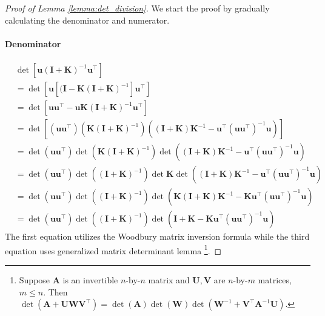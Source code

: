 \begin{proof}[Proof of Lemma \ref{lemma:det_division}]
We start the proof by gradually calculating the denominator and numerator.
\paragraph{Denominator}

\begin{align*}
&\det[\mathbf{u} (\mathbf{I} + \mathbf{K})^{-1} \mathbf{u}^\top] \\ &= \det [\mathbf{u} \left[ (\mathbf{I} - \mathbf{K}(\mathbf{I}+\mathbf{K})^{-1}\right]\mathbf{u}^\top]\\
&=\det [\mathbf{u} \mathbf{u}^\top - \mathbf{u} \mathbf{K}(\mathbf{I}+\mathbf{K})^{-1} \mathbf{u}^\top]  \\
&= \det \left[  (\mathbf{u} \mathbf{u}^\top) \left(\mathbf{K}(\mathbf{I}+\mathbf{K})^{-1}\right) \left( (\mathbf{I} + \mathbf{K}) \mathbf{K}^{-1} - \mathbf{u}^\top (\mathbf{u} \mathbf{u}^\top)^{-1} \mathbf{u}\right) \right] \\
&= \det (\mathbf{u} \mathbf{u}^\top) \det \left(\mathbf{K}(\mathbf{I}+\mathbf{K})^{-1}\right) \det \left( (\mathbf{I} + \mathbf{K}) \mathbf{K}^{-1} - \mathbf{u}^\top (\mathbf{u} \mathbf{u}^\top)^{-1} \mathbf{u}\right) \\
&= \det (\mathbf{u} \mathbf{u}^\top) \det \left((\mathbf{I}+\mathbf{K})^{-1}\right) \det \mathbf{K} \det \left( (\mathbf{I} + \mathbf{K}) \mathbf{K}^{-1} - \mathbf{u}^\top (\mathbf{u} \mathbf{u}^\top)^{-1} \mathbf{u}\right) \\
& = \det (\mathbf{u} \mathbf{u}^\top) \det \left((\mathbf{I}+\mathbf{K})^{-1}\right) \det \left( \mathbf{K}(\mathbf{I} + \mathbf{K}) \mathbf{K}^{-1} - \mathbf{K}\mathbf{u}^\top (\mathbf{u} \mathbf{u}^\top)^{-1} \mathbf{u}\right) \\
\label{Eqn:u_K_inv_uT}
& = \det (\mathbf{u} \mathbf{u}^\top) \det \left((\mathbf{I}+\mathbf{K})^{-1}\right) \det \left(\mathbf{I} + \mathbf{K} - \mathbf{K}\mathbf{u}^\top (\mathbf{u} \mathbf{u}^\top)^{-1} \mathbf{u}\right)
\end{align*}
The first equation utilizes the Woodbury matrix inversion formula while the third equation uses generalized matrix determinant lemma \footnote{Suppose $\mathbf{A}$ is an invertible $n$-by-$n$ matrix and $\mathbf{U}, \mathbf{V}$ are $n$-by-$m$ matrices, $m \le n$. Then $\det(\mathbf{A} + \mathbf{U}\mathbf{W}\mathbf{V}^\top) = \det(\mathbf{A}) \det(\mathbf{W})\det(\mathbf{W}^{-1} + \mathbf{V}^\top \mathbf{A}^{-1} \mathbf{U})$.}.

\end{proof}
